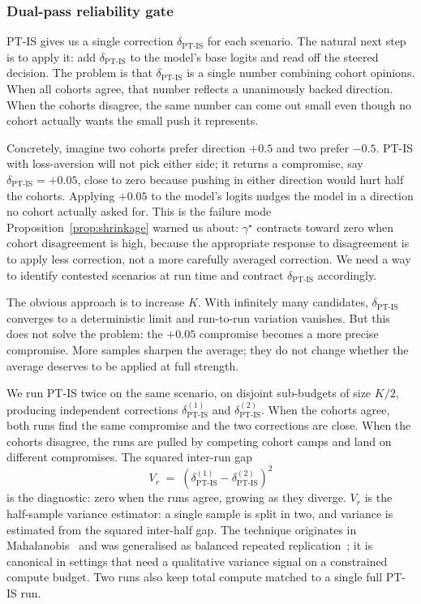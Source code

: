 \documentclass{article}
\begin{document}
\vspace{-0.1cm}
\subsubsection{Dual-pass reliability gate}
\label{sec:method:estimator:gate}

PT-IS gives us a single correction $\delta_{\text{PT-IS}}$ for 
each scenario. The natural next step is to apply it: add 
$\delta_{\text{PT-IS}}$ to the model's base logits and read off 
the steered decision. The problem is that $\delta_{\text{PT-IS}}$ 
is a single number combining cohort opinions. When all cohorts 
agree, that number reflects a unanimously backed direction. When 
the cohorts disagree, the same number can come out small even 
though no cohort actually wants the small push it represents.

Concretely, imagine two cohorts prefer direction $+0.5$ and two 
prefer $-0.5$. PT-IS with loss-aversion will not pick either 
side; it returns a compromise, say $\delta_{\text{PT-IS}} = 
+0.05$, close to zero because pushing in either direction would 
hurt half the cohorts. Applying $+0.05$ to the model's logits 
nudges the model in a direction no cohort actually asked for. This is the failure mode Proposition~\ref{prop:shrinkage} warned 
us about: $\gamma^\star$ contracts toward zero when cohort 
disagreement is high, because the appropriate response to 
disagreement is to apply less correction, not a more carefully 
averaged correction. We need a way to identify contested 
scenarios at run time and contract $\delta_{\text{PT-IS}}$ 
accordingly.

The obvious approach is to increase $K$. With infinitely many 
candidates, $\delta_{\text{PT-IS}}$ converges to a deterministic 
limit and run-to-run variation vanishes. But this does not solve 
the problem: the $+0.05$ compromise becomes a more precise 
compromise. More samples sharpen the average; they do not 
change whether the average deserves to be applied at full 
strength.

We run PT-IS twice on the same scenario, on disjoint sub-budgets 
of size $K/2$, producing independent corrections 
$\delta^{(1)}_{\text{PT-IS}}$ and $\delta^{(2)}_{\text{PT-IS}}$. 
When the cohorts agree, both runs find the same compromise and 
the two corrections are close. When the cohorts disagree, the 
runs are pulled by competing cohort camps and land on different 
compromises. The squared inter-run gap
\begin{equation*}
V_r \;=\; (\delta^{(1)}_{\text{PT-IS}} - 
\delta^{(2)}_{\text{PT-IS}})^2
\end{equation*}
is the diagnostic: zero when the runs agree, growing as they 
diverge. $V_r$ is the half-sample variance estimator: a single sample is 
split in two, and variance is estimated from the squared 
inter-half gap. The technique originates in 
Mahalanobis~\citep{mahalanobis1946} and was generalised as 
balanced repeated 
replication~\citep{mccarthy1969pseudo, wolter2007variance}; it 
is canonical in settings that need a qualitative variance signal 
on a constrained compute budget. Two runs also keep total 
compute matched to a single full PT-IS run.
\end{document}
